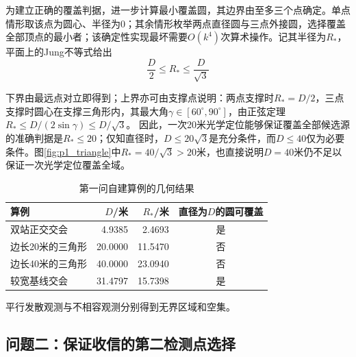 \begin{samepage}
为建立正确的覆盖判据，进一步计算最小覆盖圆，其边界由至多三个点确定\cite{welzl}。单点情形取该点为圆心、半径为0；其余情形枚举两点直径圆与三点外接圆，选择覆盖全部顶点的最小者；该确定性实现最坏需要$O(k^4)$次算术操作。记其半径为$R_*$，平面上的Jung不等式\cite{jung}给出
\begin{equation}
\frac{D}{2}\le R_*\le\frac{D}{\sqrt3}
 \label{eq:jung}
\end{equation}
\end{samepage}
下界由最远点对立即得到；上界亦可由支撑点说明：两点支撑时$R_*=D/2$，三点支撑时圆心在支撑三角形内，其最大角$\gamma\in[60^\circ,90^\circ]$，由正弦定理$R_*\le D/(2\sin\gamma)\le D/\sqrt3$。
因此，一次20米光学定位能够保证覆盖全部候选源的准确判据是$R_*\le20$；仅知直径时，$D\le20\sqrt3$是充分条件，而$D\le40$仅为必要条件。图\ref{fig:p1_triangle}中$R_*=40/\sqrt3>20$米，也直接说明$D=40$米仍不足以保证一次光学定位覆盖全域。

\begin{table}[htbp]
 \centering
 \caption{第一问自建算例的几何结果}
 \label{tab:p1_geometry}
 \begin{tabular}{lrrc}
 \hline
 算例 & $D$/米 & $R_*$/米 & 直径为$D$的圆可覆盖\\
 \hline
 双站正交交会 & 4.9385 & 2.4693 & 是\\
 边长20米的三角形 & 20.0000 & 11.5470 & 否\\
 边长40米的三角形 & 40.0000 & 23.0940 & 否\\
 较宽基线交会 & 31.4797 & 15.7398 & 是\\
 \hline
 \end{tabular}
\end{table}
平行发散观测与不相容观测分别得到无界区域和空集。
\FloatBarrier

\subsection{问题二：保证收信的第二检测点选择}
\label{sub:model_p2}
